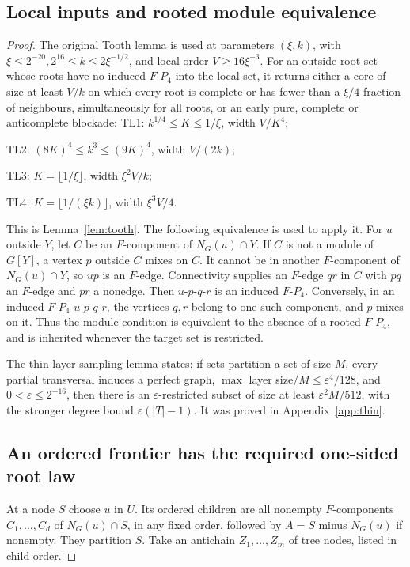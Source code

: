 \documentclass[11pt,a4paper]{article}
\theoremstyle{definition}
\theoremstyle{remark}
\numberwithin{equation}{section}
\begin{document}
\subsection{Local inputs and rooted module equivalence}\label{subsec:rp5-local}
\begin{proof}
The original Tooth lemma is used at parameters \((\xi,\allowbreak k)\), with \(\xi\le\allowbreak 2^{-20},\allowbreak  2^{16}\le\allowbreak k\le\allowbreak 2\xi^{-1/2}\), and local order \(V\ge\allowbreak 16\xi^{-3}\). For an outside root set whose roots have no induced \(F\text{-}P_{4}\) into the local set, it returns either a core of size at least \(V/k\) on which every root is complete or has fewer than a \(\xi/4\) fraction of neighbours, simultaneously for all roots, or an early pure, complete or anticomplete blockade:
\noindent TL1: \(k^{1/4}\le\allowbreak K\le\allowbreak 1/\xi\), width \(V/K^{4}\);\par
\noindent TL2: \((8K)^{4}\le\allowbreak k^{3}\le\allowbreak (9K)^{4}\), width \(V/(2k)\);\par
\noindent TL3: \(K=\lfloor 1/\xi\rfloor\), width \(\xi^{2} V/k\);\par
\noindent TL4: \(K=\lfloor 1/(\xi k)\rfloor\), width \(\xi^{3} V/4\).\par
This is Lemma~\ref{lem:tooth}. The following equivalence is used to apply it. For \(u\) outside \(Y\), let \(C\) be an \(F\)-component of \(N_{G}(u) \cap  Y\). If \(C\) is not a module of \(G[Y]\), a vertex \(p\) outside \(C\) mixes on \(C\). It cannot be in another \(F\)-component of \(N_{G}(u) \cap  Y\), so \(up\) is an \(F\)-edge. Connectivity supplies an \(F\)-edge \(qr\) in \(C\) with \(pq\) an \(F\)-edge and \(pr\) a nonedge. Then \(u\text{-}p\text{-}q\text{-}r\) is an induced \(F\text{-}P_{4}\). Conversely, in an induced \(F\text{-}P_{4}\) \(u\text{-}p\text{-}q\text{-}r\), the vertices \(q,\allowbreak r\) belong to one such component, and \(p\) mixes on it. Thus the module condition is equivalent to the absence of a rooted \(F\text{-}P_{4}\), and is inherited whenever the target set is restricted.

The thin-layer sampling lemma states: if sets partition a set of size \(M\), every partial transversal induces a perfect graph, \(\max \) layer size/\(M\le\allowbreak \varepsilon^{4}/128\), and \(0<\varepsilon\le\allowbreak 2^{-16}\), then there is an \(\varepsilon\)-restricted subset of size at least \(\varepsilon^{2} M/512\), with the stronger degree bound \(\varepsilon(|T|-1)\). It was proved in Appendix~\ref{app:thin}.
\subsection{An ordered frontier has the required one-sided root law}\label{subsec:rp5-frontier-law}
At a node \(S\) choose \(u\) in \(U\). Its ordered children are all nonempty \(F\)-components \(C_{1},\ldots,C_{d}\) of \(N_{G}(u) \cap  S\), in any fixed order, followed by \(A=S\) minus \(N_{G}(u)\) if nonempty. They partition \(S\). Take an antichain \(Z_{1},\ldots,Z_{m}\) of tree nodes, listed in child order.


\end{proof}
\end{document}

